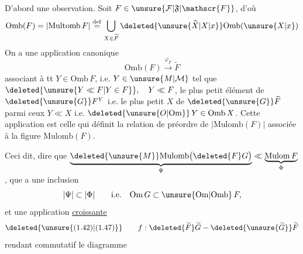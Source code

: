 D'abord une observation. Soit $F\in\unsure{\mathcal{F}|\mathfrak{F}|\mathscr{F}}$, d'où
\[
\mathrm{Omb}(F)=\lvert\mathrm{Multomb}\,F\rvert
 \overset{\mathrm{def}}{=}
 \bigcup_{X\in\widetilde F}\deleted{\unsure{\widetilde X|X|x}}\mathrm{Omb}(\unsure{X|x})
\]
On a une application canonique
\[
\mathrm{Omb}(F)\xrightarrow{\varphi_F}\widetilde F
\]
associant à tt $Y\in\mathrm{Omb}\,F$, i.e. $Y\in\unsure{M|\mathcal{M}}$ tel que
$\deleted{\unsure{Y\ll F|Y\in F}},\quad Y\ll F$, le plus petit élément de $\deleted{\unsure{G}}F^{Y}$
i.e. le plus petit $X$ de $\deleted{\unsure{G}}\widetilde F$ parmi ceux 
$Y\ll X$ i.e. $\deleted{\unsure{O|\mathrm{Om}}}\,Y\in\mathrm{Omb}\,X$. Cette application est celle qui définit la relation de préordre de $\lvert\mathrm{Mulomb}(F)\rvert$ associée à la figure $\mathrm{Mulomb}(F)$.

Ceci dit,  dire que
$\underbrace{\deleted{\unsure{M}}\mathrm{Mulomb}\bigl(\deleted{F}G\bigr)}_{\Psi}\ll\underbrace{\mathrm{Mulom}\,F}_{\Phi}$,
 que  a une inclusion
\[
 \lvert\Psi\rvert\subset\lvert\Phi\rvert\qquad\text{i.e.}\quad \mathrm{Om}\,G\subset\unsure{\mathrm{Om}|\mathrm{Omb}}\,F,
\]
et une application \uline{croissante}
\[
\deleted{\unsure{\text{(1.42)}|\text{(1.47)}}}\qquad
f:\deleted{\widetilde F}\widetilde G\mathbin{-}\deleted{\unsure{\widetilde G}}\widetilde F
\]
rendant commutatif le diagramme

